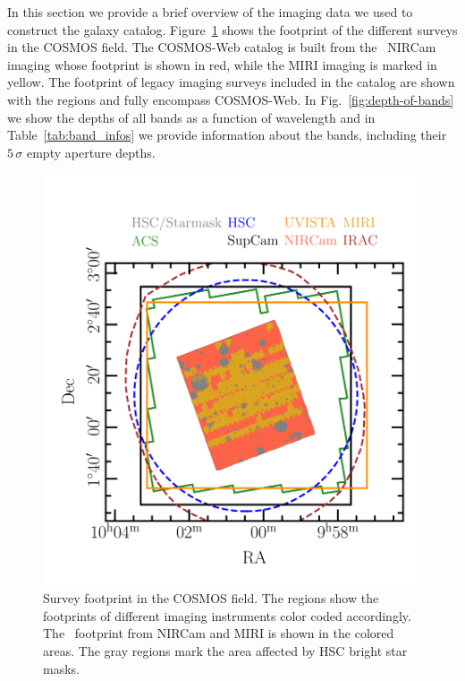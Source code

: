 \documentclass[longauth]{aa}
\begin{document}
In this section we provide a brief overview of the imaging data we used to construct the galaxy catalog. Figure~\ref{fig:survey-footprint} shows the footprint of the different surveys in the COSMOS field. The COSMOS-Web catalog is built from the \JWST\ NIRCam imaging whose footprint is shown in red, while the MIRI imaging is marked in yellow. The footprint of legacy imaging surveys included in the catalog are shown with the regions and fully encompass COSMOS-Web. In Fig.~\ref{fig:depth-of-bands} we show the depths of all bands as a function of wavelength and in Table~\ref{tab:band_infos} we provide information about the bands, including their $5\,\sigma$ empty aperture depths.

\begin{figure}[t!]
\includegraphics[width=1\columnwidth, trim=0.2cm 0.8cm 0cm 1cm, clip]{figures/survey_footprint.pdf}
\caption{Survey footprint in the COSMOS field. The regions show the footprints of different imaging instruments color coded accordingly. The \JWST\ footprint from NIRCam and MIRI is shown in the colored areas. The gray regions mark the area affected by HSC bright star masks.
\label{fig:survey-footprint}}
\end{figure}
\end{document}
